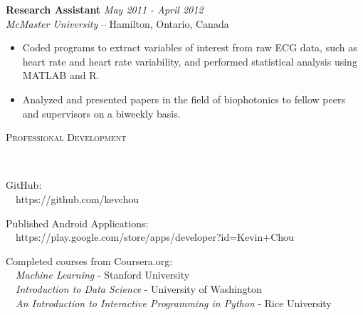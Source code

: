\documentclass[9pt]{article}
\newenvironment{changemargin}[2]{%
  \begin{list}{}{%
    \setlength{\topsep}{0pt}%
    \setlength{\leftmargin}{#1}%
    \setlength{\rightmargin}{#2}%
    \setlength{\listparindent}{\parindent}%
    \setlength{\itemindent}{\parindent}%
    \setlength{\parsep}{\parskip}%
  }%
  \item[]}{\end{list}
}
\newcommand{\lineover}{
  \begin{changemargin}{-0.05in}{-0.05in}
    \vspace*{-8pt}
    \hrulefill \\
    \vspace*{-2pt}
  \end{changemargin}
}
\newcommand{\header}[1]{
  \begin{changemargin}{-0.5in}{-0.5in}
    {\large \scshape{#1}}\\
    \lineover
  \end{changemargin}
}
\newenvironment{body} {
  \vspace*{-16pt}
  \begin{changemargin}{-0.25in}{-0.5in}
  }
  {\end{changemargin}
}
\begin{document}
\begin{body}
  \textbf {Research Assistant} \hfill \emph{May 2011 - April 2012}\\
  \emph{McMaster University} -- Hamilton, Ontario, Canada
  \vspace*{-4pt}
  \begin{itemize} \itemsep -0pt
    \item Coded programs to extract variables of interest from raw ECG data, such
      as heart rate and heart rate variability, and performed statistical analysis
      using MATLAB and R.
    \item Analyzed and presented papers in the field of biophotonics to fellow
      peers and supervisors on a biweekly basis.
  \end{itemize}

\end{body}

\smallskip


\header{Professional Development}
\begin{body}
  \vspace{14pt}




  GitHub: \\
  \ \ https://github.com/kevchou
  \vspace{0.2cm}

  Published Android Applications: \\
  \ \ https://play.google.com/store/apps/developer?id=Kevin+Chou
  \vspace{0.2cm}

  Completed courses from Coursera.org:\\
  \ \ \emph{Machine Learning} - Stanford University \\
  \ \ \emph{Introduction to Data Science} - University of Washington \\
  \ \ \emph{An Introduction to Interactive Programming in Python} - Rice University \\

\end{body}
\end{document}
